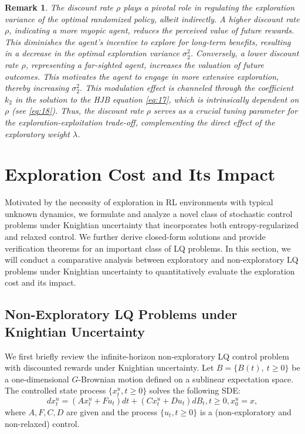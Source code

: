\documentclass[onecolumn, journal]{IEEEtran} %
\newtheorem{remark}{Remark}
\begin{document}
	\begin{remark}
		The discount rate $\rho$ plays a pivotal role in regulating the exploration variance of the optimal randomized policy, albeit indirectly. A higher discount rate $\rho$, indicating a more myopic agent, reduces the perceived value of future rewards. This diminishes the agent's incentive to explore for long-term benefits, resulting in a decrease in the optimal exploration variance $\sigma_2^2$. Conversely, a lower discount rate $\rho$, representing a far-sighted agent, increases the valuation of future outcomes. This motivates the agent to engage in more extensive exploration, thereby increasing $\sigma_2^2$. This modulation effect is channeled through the coefficient $k_2$ in the solution to the HJB equation \eqref{eq:17}, which is intrinsically dependent on $\rho$ (see \eqref{eq:18}). Thus, the discount rate $\rho$ serves as a crucial tuning parameter for the exploration-exploitation trade-off, complementing the direct effect of the exploratory weight $\lambda$.
	\end{remark}
	
	\section{Exploration Cost and Its Impact}
	
	Motivated by the necessity of exploration in RL environments with typical unknown dynamics, we formulate and analyze a novel class of stochastic control problems under Knightian uncertainty that incorporates both entropy-regularized and relaxed control. We further derive closed-form solutions and provide verification theorems for an important class of LQ problems. In this section, we will conduct a comparative analysis between exploratory and non-exploratory LQ problems under Knightian uncertainty to quantitatively evaluate the exploration cost and its impact.
	\subsection{Non-Exploratory LQ Problems under Knightian Uncertainty}
	
	We first briefly review the infinite-horizon non-exploratory LQ control problem with discounted rewards under Knightian uncertainty. Let $B = \{ B(t),\ t \geq 0 \}$ be a one-dimensional $G$-Brownian motion defined on a sublinear expectation space. The controlled state process $\{x_t^u, t \geq 0\}$ solves the following SDE:
	\begin{equation*}
		dx_t^u = (Ax_t^u + F u_t)dt + (Cx_t^u + Du_t)dB_t, t \geq 0, x_0^u = x, 
	\end{equation*}
	where $A, F, C, D$ are given and the process $\{u_t, t \geq 0\}$ is a (non-exploratory and non-relaxed) control.
	
\end{document}
